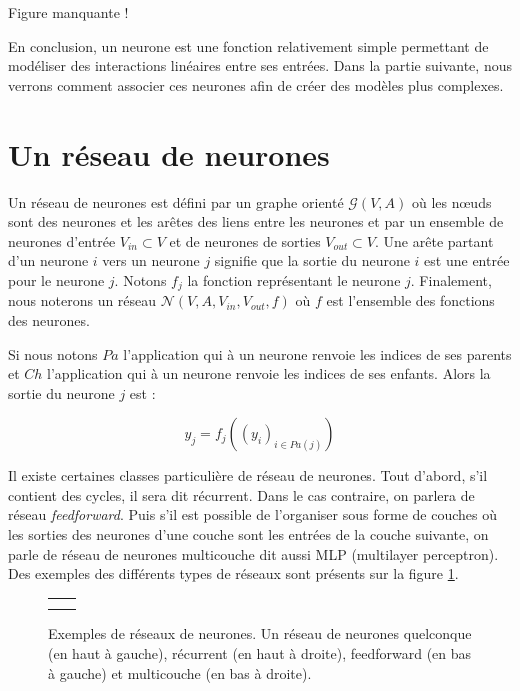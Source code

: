 \documentclass{report}
\begin{document}
Figure manquante !

En conclusion, un neurone est une fonction relativement simple permettant de modéliser des interactions linéaires entre ses entrées. Dans la partie suivante, nous verrons comment associer ces neurones afin de créer des modèles plus complexes.

\section{Un réseau de neurones}

Un réseau de neurones est défini par un graphe orienté $\mathcal{G}(V, A)$ où les n\oe{}uds sont des neurones et les arêtes des liens entre les neurones et par un ensemble de neurones d'entrée $V_{in} \subset V$ et de neurones de sorties $V_{out} \subset V$. Une arête partant d'un neurone $i$ vers un neurone $j$ signifie que la sortie du neurone $i$ est une entrée pour le neurone $j$. Notons $f_{j}$ la fonction représentant le neurone $j$. Finalement, nous noterons un réseau $\mathcal{N}(V, A, V_{in}, V_{out}, f)$ où $f$ est l'ensemble des fonctions des neurones.

Si nous notons $Pa$ l'application qui à un neurone renvoie les indices de ses parents et $Ch$ l'application qui à un neurone renvoie les indices de ses enfants. Alors la sortie du neurone $j$ est :

\begin{equation}
y_{j} = f_{j}((y_{i})_{i \in Pa(j)})
\label{eq_propagation}
\end{equation} 

Il existe certaines classes particulière de réseau de neurones. Tout d'abord, s'il contient des cycles, il sera dit récurrent. Dans le cas contraire, on parlera de réseau \textit{feedforward}. Puis s'il est possible de l'organiser sous forme de couches où les sorties des neurones d'une couche sont les entrées de la couche suivante, on parle de réseau de neurones multicouche dit aussi MLP (multilayer perceptron). Des exemples des différents types de réseaux sont présents sur la figure \ref{reseaux}.

\begin{figure}
\begin{center}
\begin{tabular}{cc}
 &  \\
 &  \\
\end{tabular}
\caption{Exemples de réseaux de neurones. Un réseau de neurones quelconque (en haut à gauche),  récurrent (en haut à droite), feedforward (en bas à gauche) et multicouche (en bas à droite).} 
\label{reseaux}
\end{center}
\end{figure}
\end{document}
